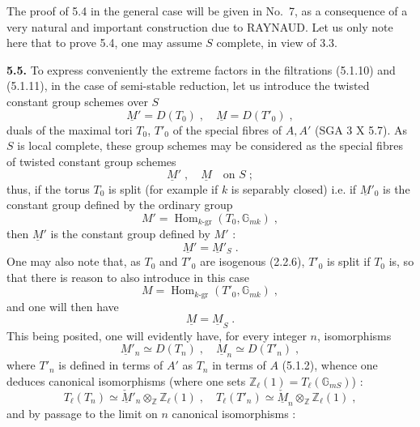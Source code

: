 \documentclass[11pt]{article}
\newcommand{\Hom}{\operatorname{Hom}}
\newcommand{\ZZ}{\mathbb Z}
\newcommand{\GG}{\mathbb G}
\newcommand{\Tl}{T_{\ell}}
\begin{document}
The proof of 5.4 in the general case will be given in No.~7, as a
consequence of a very natural and important construction due to RAYNAUD.
Let us only note here that to prove 5.4, one may assume $S$ complete, in
view of 3.3.

\medskip

\noindent\textbf{5.5.} To express conveniently the extreme factors in
the filtrations (5.1.10) and (5.1.11), in the case of semi-stable
reduction, let us introduce the twisted constant group schemes over $S$
\begin{equation}
\underline{M}' = D(T_0) \; , \quad \underline{M} = D(T'_0) \; ,
\end{equation}
duals of the maximal tori $T_0$, $T'_0$ of the special fibres of $A, A'$
(SGA 3 X 5.7). As $S$ is local complete, these group schemes may be
considered as the special fibres of twisted constant group schemes
\begin{equation}
\underline{M}' \; , \quad \underline{M} \quad \text{on } S \; ;
\end{equation}
thus, if the torus $T_0$ is split (for example if $k$ is separably
closed) i.e. if $\underline{M}'_0$ is the constant group defined by the
ordinary group
\begin{equation}
M' = \Hom_{k\text{-gr}}(T_0, \GG_{mk}) \; ,
\end{equation}
then $\underline{M}'$ is the constant group defined by $M'$ :
\[
\underline{M}' = \underline{M}'_S \; .
\]
One may also note that, as $T_0$ and $T'_0$ are isogenous (2.2.6), $T'_0$
is split if $T_0$ is, so that there is reason to also introduce in this
case
\begin{equation}
M = \Hom_{k\text{-gr}}(T'_0, \GG_{mk}) \; ,
\end{equation}
and one will then have
\[
\underline{M} = \underline{M}_S \; .
\]
This being posited, one will evidently have, for every integer $n$,
isomorphisms
\begin{equation}
\underline{M}'_n \simeq D(T_n) \; , \quad \underline{M}_n \simeq
D(T'_n) \; ,
\end{equation}
where $T'_n$ is defined in terms of $A'$ as $T_n$ in terms of $A$
(5.1.2), whence one deduces canonical isomorphisms (where one sets
$\ZZ_{\ell}(1) = \Tl(\GG_{mS})$) :
\begin{equation}
\Tl(T_n) \simeq \check{\underline{M}}'_n \otimes_{\ZZ} \ZZ_{\ell}(1)
\; , \quad \Tl(T'_n) \simeq \check{\underline{M}}_n \otimes_{\ZZ}
\ZZ_{\ell}(1) \; ,
\end{equation}
and by passage to the limit on $n$ canonical isomorphisms :
\end{document}
